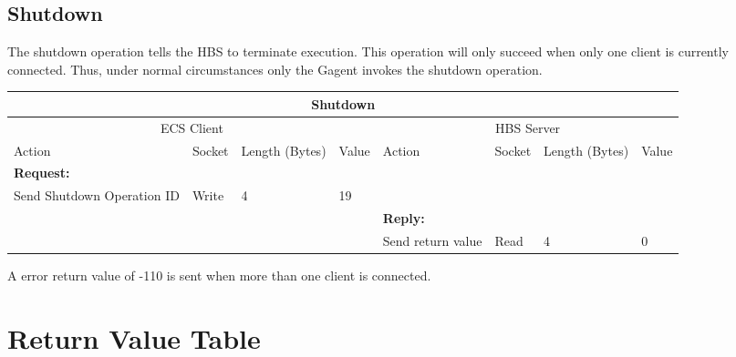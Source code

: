 \normalsize
\bigskip


\newpage
\subsection{Shutdown}

The shutdown operation tells the HBS to terminate execution.  This
operation
will only succeed when only one client is currently connected. Thus, 
under normal circumstances only the Gagent invokes the shutdown operation. 

\bigskip
\small
\begin{tabular}{|p{1.2in}|p{.4in}|p{.4in}|p{.4in}|p{1.2in}|p{.4in}|p{.4in}|p{.4in} |} \hline
\multicolumn{8}{|c|}{{\bf Shutdown}} \\ \hline
\multicolumn{4}{|c|}{ECS Client} & \multicolumn{4}{|c|}{HBS Server} \\ \hline
Action            & Socket & Length (Bytes) 
                                   & Value & Action       & Socket & Length (Bytes) & Value \\ \hline
\multicolumn{4}{|l}{{\bf Request:}}&\multicolumn{4}{|l|}{~} \\ \hline
Send
Shutdown Operation ID        & Write  & 4     & 19    &              &        &       &       \\ \hline
\multicolumn{4}{|l}{~}&\multicolumn{4}{|l|}{{\bf Reply:}} \\ \hline
                  &        &       &       & Send return
                                             value        & Read   &  4    & 0       \\ \hline
\end{tabular}
\normalsize
\bigskip

A error return value of -110 is sent when more than one client is connected.

\newpage
\appendix

\section{Return Value Table}
\label{app:return-values}

